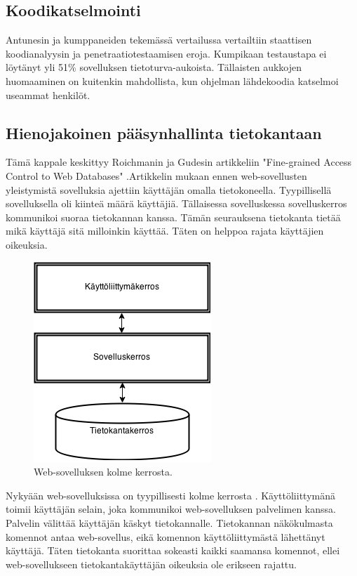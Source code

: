 \documentclass[finnish]{tktltiki2}
\theoremstyle{definition}
\theoremstyle{remark}
\begin{document}
		\subsection{Koodikatselmointi}
		Antunesin ja kumppaneiden tekemässä vertailussa\cite{vertailu} vertailtiin staattisen koodianalyysin ja penetraatiotestaamisen eroja. Kumpikaan testaustapa ei löytänyt yli 51\% sovelluksen tietoturva-aukoista. Tällaisten aukkojen huomaaminen on kuitenkin mahdollista, kun ohjelman lähdekoodia katselmoi useammat henkilöt.
		
		\subsection{Hienojakoinen pääsynhallinta tietokantaan}
		Tämä kappale keskittyy Roichmanin ja Gudesin artikkeliin "Fine-grained Access Control to Web Databases" \cite{access}.\space Artikkelin mukaan ennen web-sovellusten yleistymistä sovelluksia ajettiin käyttäjän omalla tietokoneella. Tyypillisellä sovelluksella oli kiinteä määrä  käyttäjiä. Tällaisessa sovelluskessa sovelluskerros kommunikoi suoraa tietokannan kanssa. Tämän seurauksena tietokanta tietää mikä käyttäjä sitä milloinkin käyttää. Täten on helppoa rajata käyttäjien oikeuksia.
						 \begin{figure}[h]
						 	\centering
						 	\caption{Web-sovelluksen kolme kerrosta.}
						 	\includegraphics[scale=0.55]{kandi2}
						 \end{figure}
				 
				 
		 Nykyään web-sovelluksissa on tyypillisesti kolme kerrosta \cite{access}\cite{3tier}. Käyttöliittymänä toimii käyttäjän selain, joka kommunikoi web-sovelluksen palvelimen kanssa. Palvelin välittää käyttäjän käskyt tietokannalle. Tietokannan näkökulmasta komennot antaa web-sovellus, eikä komennon käyttöliittymästä lähettänyt käyttäjä. Täten tietokanta suorittaa sokeasti kaikki saamansa komennot, ellei web-sovellukseen tietokantakäyttäjän oikeuksia ole erikseen rajattu.
		
\end{document}

